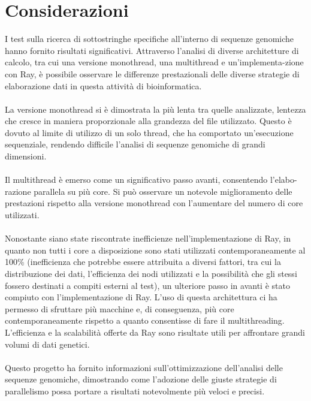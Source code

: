 \documentclass{article}
\begin{document}
    \clearpage
    
    \section{Considerazioni}
    I test sulla ricerca di sottostringhe specifiche all'interno di sequenze genomiche hanno fornito risultati significativi. Attraverso l'analisi di diverse architetture di calcolo, tra cui una versione monothread, una multithread e un'implementa-zione con Ray, è possibile osservare le differenze prestazionali delle diverse strategie di elaborazione dati in questa attività di bioinformatica.\\
    \\
    La versione monothread si è dimostrata la più lenta tra quelle analizzate, lentezza che cresce in maniera proporzionale alla grandezza del file utilizzato. Questo è dovuto al limite di utilizzo di un solo thread, che ha comportato un'esecuzione sequenziale, rendendo difficile l'analisi di sequenze genomiche di grandi dimensioni.\\
    \\
    Il multithread è emerso come un significativo passo avanti, consentendo l'elabo-razione parallela su più core. Si può osservare un notevole miglioramento delle prestazioni rispetto alla versione monothread con l'aumentare del numero di core utilizzati.\\
    \\
    Nonostante siano state riscontrate inefficienze nell'implementazione di Ray, in quanto non tutti i core a disposizione sono stati utilizzati contemporaneamente al 100\% (inefficienza che potrebbe essere attribuita a diversi fattori, tra cui la distribuzione dei dati, l'efficienza dei nodi utilizzati e la possibilità che gli stessi fossero destinati a compiti esterni al test), un ulteriore passo in avanti è stato compiuto con l'implementazione di Ray. L'uso di questa architettura ci ha permesso di sfruttare più macchine e, di conseguenza, più core contemporaneamente rispetto a quanto consentisse di fare il multithreading. L'efficienza e la scalabilità offerte da Ray sono risultate utili per affrontare grandi volumi di dati genetici.\\
    \\
    Questo progetto ha fornito informazioni sull'ottimizzazione dell'analisi delle sequenze genomiche, dimostrando come l'adozione delle giuste strategie di parallelismo possa portare a risultati notevolmente più veloci e precisi.
    
\end{document}
